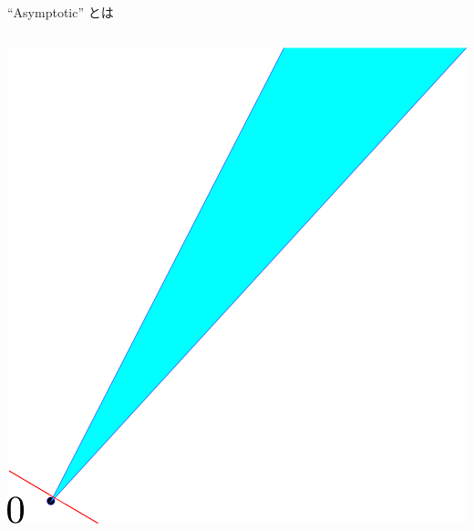 \documentclass[aspectratio=169, dvipdfmx, 11pt]{beamer} %
\begin{document}
\begin{frame}{``Asymptotic'' とは}
\begin{columns}
\begin{column}{0.48\textwidth}
      \includegraphics[keepaspectratio, scale=0.095]{figures/asymptotic_meaning_2.eps}
    \end{column}
  \end{columns}
\end{frame}
\end{document}
